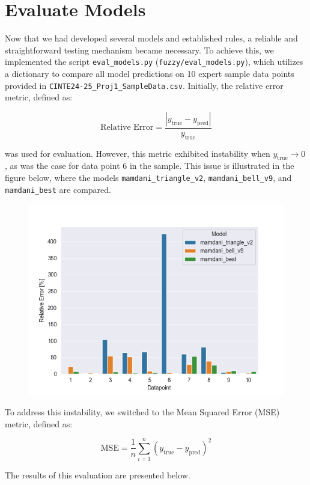 \documentclass[11pt]{report}
\begin{document}
\section{Evaluate Models}
Now that we had developed several models and established rules, a reliable and straightforward testing mechanism became necessary.
To achieve this, we implemented the script \texttt{eval\_models.py} (\texttt{fuzzy/eval\_models.py}),
which utilizes a dictionary to compare all model predictions on 10 expert sample data points provided in \texttt{CINTE24-25\_Proj1\_SampleData.csv}.
Initially, the relative error metric, defined as:

\[
    \text{Relative Error} = \frac{|y_{\text{true}} - y_{\text{pred}}|}{y_{\text{true}}}
\]

was used for evaluation.
However, this metric exhibited instability when $y_{\text{true}} \to 0$, as was the case for data point 6 in the sample.
This issue is illustrated in the figure below, where the models \texttt{mamdani\_triangle\_v2}, \texttt{mamdani\_bell\_v9}, and \texttt{mamdani\_best} are compared.

\begin{figure}[htpb]
\includegraphics[width=\textwidth]{../images/eval_models/relative_error}
\end{figure}

To address this instability, we switched to the Mean Squared Error (MSE) metric, defined as:

\[
    \text{MSE} = \frac{1}{n} \sum_{i=1}^{n} (y_{\text{true}} - y_{\text{pred}})^2
\]

The results of this evaluation are presented below.
\end{document}
